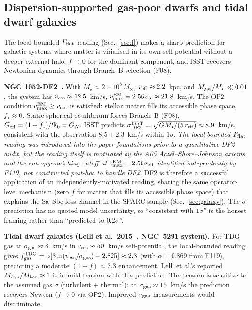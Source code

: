 \documentclass[aps,prd,twocolumn,nofootinbib,floatfix,superscriptaddress]{revtex4-2}
\begin{document}
\subsection{Dispersion-supported gas-poor dwarfs and tidal dwarf galaxies}
\label{sec:df2_tdg}

The local-bounded $F_{\rm flat}$ reading (Sec.~\ref{sec:f}) makes a
sharp prediction for galactic systems where matter is virialised in
its own self-potential without a deeper external halo: $f \to 0$ for
the dominant component, and ISST recovers Newtonian dynamics through
Branch~B selection (F08).

\textbf{NGC 1052-DF2~\cite{vanDokkum2018,Trujillo2019}.}
With $M_\star \approx 2\times 10^8\,M_\odot$, $r_{\rm eff} \approx 2.2$~kpc,
and $M_{\rm gas}/M_\star \ll 0.01$, the system has
$v_{\rm esc} \approx 12.5$~km/s, $v_{\rm max}^{\rm EM} = 2.56\,\sigma_\star
\approx 21.8$~km/s. The OP2 condition $v_{\rm max}^{\rm EM} \geq v_{\rm esc}$
is satisfied: stellar matter fills its accessible phase space,
$f_\star \approx 0$. Static spherical equilibrium forces Branch~B
(F08), $G_{\rm eff} = (1+f_\star)/\Psi_0 = G_N$. ISST predicts
$\sigma_{\rm DF2}^{\rm ISST} = \sqrt{GM_\star/(5\,r_{\rm eff})}
\approx 8.9$~km/s, consistent with the observation
$8.5 \pm 2.3$~km/s within $1\sigma$. \emph{The local-bounded
$F_{\rm flat}$ reading was introduced into the paper foundations
prior to a quantitative DF2 audit, but the reading itself is
motivated by the A05 Aczél--Shore--Johnson axioms and the
entropy-matching cutoff at $v_{\rm max}^{\rm EM}=2.56\sigma_{\rm eff}$
identified independently by F119, not constructed post-hoc to
handle DF2}. DF2 is therefore a successful application of an
independently-motivated reading, sharing the same operator-level
mechanism (zero $f$ for matter that fills its accessible phase
space) that explains the Sa--Sbc loss-channel in the SPARC sample
(Sec.~\ref{sec:galaxy}). The $\sigma$ prediction has no quoted
model uncertainty, so ``consistent with $1\sigma$'' is the honest
framing rather than ``predicted to $0.2\sigma$''.

\textbf{Tidal dwarf galaxies (Lelli et al.~2015~\cite{Lelli2015},
NGC~5291 system).} For TDG gas at $\sigma_{\rm gas} \approx 8$~km/s
in $v_{\rm esc} \approx 50$~km/s self-potential, the local-bounded
reading gives $f_{\rm gas}^{\rm TDG} = \alpha[3\ln(v_{\rm esc}/\sigma_{\rm gas})
- 2.825] \approx 2.3$ (with $\alpha = 0.869$ from F119), predicting
a moderate $(1+f) \approx 3.3$ enhancement. Lelli et al.'s reported
$M_{\rm dyn}/M_{\rm bar} \approx 1$ is in mild tension with this
prediction. The tension is sensitive to the assumed gas $\sigma$
(turbulent + thermal): at $\sigma_{\rm gas} \approx 15$~km/s the
prediction recovers Newton ($f \to 0$ via OP2). Improved
$\sigma_{\rm gas}$ measurements would discriminate.
\end{document}
